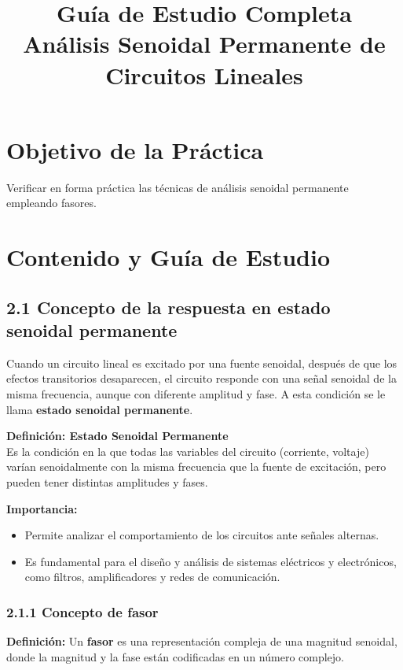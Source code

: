\documentclass[12pt]{article}
\title{Guía de Estudio Completa\\ Análisis Senoidal Permanente de Circuitos Lineales}
\author{}
\date{}
\begin{document}
\maketitle

\section*{Objetivo de la Práctica}
Verificar en forma práctica las técnicas de análisis senoidal permanente empleando fasores.

\section*{Contenido y Guía de Estudio}

\subsection*{2.1 Concepto de la respuesta en estado senoidal permanente}
Cuando un circuito lineal es excitado por una fuente senoidal, después de que los efectos transitorios desaparecen, el circuito responde con una señal senoidal de la misma frecuencia, aunque con diferente amplitud y fase. A esta condición se le llama \textbf{estado senoidal permanente}.

\textbf{Definición: Estado Senoidal Permanente} \\
Es la condición en la que todas las variables del circuito (corriente, voltaje) varían senoidalmente con la misma frecuencia que la fuente de excitación, pero pueden tener distintas amplitudes y fases.

\textbf{Importancia:}
\begin{itemize}
    \item Permite analizar el comportamiento de los circuitos ante señales alternas.
    \item Es fundamental para el diseño y análisis de sistemas eléctricos y electrónicos, como filtros, amplificadores y redes de comunicación.
\end{itemize}

\vspace{0.5cm}
\subsubsection*{2.1.1 Concepto de fasor}

\textbf{Definición:} Un \textbf{fasor} es una representación compleja de una magnitud senoidal, donde la magnitud y la fase están codificadas en un número complejo. 
\end{document}
